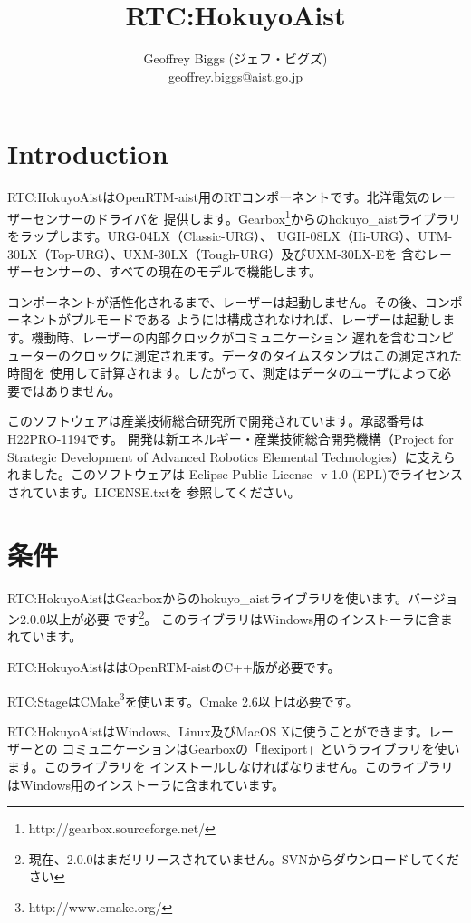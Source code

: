 \documentclass[a4paper,10pt]{article}
\title{RTC:HokuyoAist}
\author{Geoffrey Biggs (ジェフ・ビグズ)\\
geoffrey.biggs@aist.go.jp}
\newenvironment{Japanese}{%
  \CJKfamily{min}%
  \CJKtilde
  \CJKnospace}{}
\begin{document}
\begin{CJK}{UTF8}{}
\begin{Japanese}

\maketitle

\section{Introduction}
\label{sec:intro}

RTC:HokuyoAistはOpenRTM-aist用のRTコンポーネントです。北洋電気のレーザーセンサーのドライバを
提供します。Gearbox\footnote{http://gearbox.sourceforge.net/}からのhokuyo\_aistライブラリをラップします。URG-04LX（Classic-URG）、
UGH-08LX（Hi-URG）、UTM-30LX（Top-URG）、UXM-30LX（Tough-URG）及びUXM-30LX-Eを
含むレーザーセンサーの、すべての現在のモデルで機能します。

コンポーネントが活性化されるまで、レーザーは起動しません。その後、コンポーネントがプルモードである
ようには構成されなければ、レーザーは起動します。機動時、レーザーの内部クロックがコミュニケーション
遅れを含むコンピューターのクロックに測定されます。データのタイムスタンプはこの測定された時間を
使用して計算されます。したがって、測定はデータのユーザによって必要ではありません。

このソフトウェアは産業技術総合研究所で開発されています。承認番号はH22PRO-1194です。
開発は新エネルギー・産業技術総合開発機構（Project for Strategic Development of Advanced
Robotics Elemental Technologies）に支えられました。このソフトウェアは
Eclipse Public License -v 1.0 (EPL)でライセンスされています。LICENSE.txtを
参照してください。

\section{条件}
\label{sec:requirements}

RTC:HokuyoAistはGearboxからのhokuyo\_aistライブラリを使います。バージョン2.0.0以上が必要
です\footnote{現在、2.0.0はまだリリースされていません。SVNからダウンロードしてください}。
このライブラリはWindows用のインストーラに含まれています。

RTC:HokuyoAistははOpenRTM-aistのC++版が必要です。

RTC:StageはCMake\footnote{http://www.cmake.org/}を使います。Cmake
2.6以上は必要です。

RTC:HokuyoAistはWindows、Linux及びMacOS Xに使うことができます。レーザーとの
コミュニケーションはGearboxの「flexiport」というライブラリを使います。このライブラリを
インストールしなければなりません。このライブラリはWindows用のインストーラに含まれています。


\end{Japanese}
\end{CJK}
\end{document}
